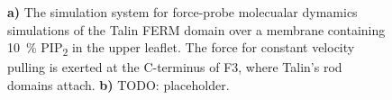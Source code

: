 \documentclass[
  letterpaper,
  DIV=11,
  numbers=noendperiod]{scrartcl}
\begin{document}
\begin{figure}

\begin{minipage}[t]{0.50\linewidth}

{\centering 


}

\subcaption{\label{fig-ferm-lat-pull}~}
\end{minipage}%
%
\begin{minipage}[t]{0.50\linewidth}

{\centering 


}

\subcaption{\label{fig-ferm-lat-pull}~}
\end{minipage}%
\newline
\begin{minipage}[t]{0.50\linewidth}

{\centering 

\raisebox{-\height}{

}

}

\end{minipage}%

\caption{\label{fig-pulling}\textbf{a)} The simulation system for
force-probe molecualar dymamics simulations of the Talin FERM domain
over a membrane containing 10~\% PIP\textsubscript{2} in the upper
leaflet. The force for constant velocity pulling is exerted at the
C-terminus of F3, where Talin's rod domains attach. \textbf{b)} TODO:
placeholder.}

\end{figure}
\end{document}
